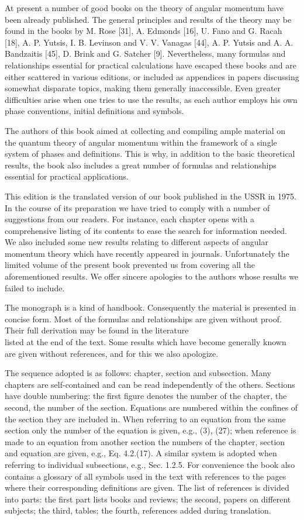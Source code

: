 At present a number of good books on the theory of angular momentum have been already published. The general principles and results of the theory may be found in the books by M. Rose [31], A. Edmonds [16], U. Fano and G. Racah [18], A. P. Yutsis, I. B. Levinson and V. V. Vanagas [44], A. P. Yutsis and A. A. Bandzaitis [45], D. Brink and G. Satcher [9]. Nevertheless, many formulas and relationships essential for practical calculations have escaped these books and are either scattered in various editions, or included as appendices in papers discussing somewhat disparate topics, making them generally inaccessible. Even greater difficulties arise when one tries to use the results, as each author employs his own phase conventions, initial definitions and symbols.

The authors of this book aimed at collecting and compiling ample material on the quantum theory of angular momentum within the framework of a single system of phases and definitions. This is why, in addition to the basic theoretical results, the book also includes a great number of formulas and relationships essential for practical applications.

This edition is the translated version of our book published in the USSR in 1975. In the course of its preparation we have tried to comply with a number of suggestions from our readers. For instance, each chapter opens with a comprehensive listing of its contents to ease the search for information needed. We also included some new results relating to different aspects of angular momentum theory which have recently appeared in journals. Unfortunately the limited volume of the present book prevented us from covering all the aforementioned results. We offer sincere apologies to the authors whose results we failed to include.

The monograph is a kind of handbook. Consequently the material is presented in concise form. Most of the formulas and relationships are given without proof. Their full derivation may be found in the literature\\
listed at the end of the text. Some results which have become generally known are given without references, and for this we also apologize.

The sequence adopted is as follows: chapter, section and subsection. Many chapters are self-contained and can be read independently of the others. Sections have double numbering: the first figure denotes the number of the chapter, the second, the number of the section. Equations are numbered within the confines of the section they are included in. When referring to an equation from the same section only the number of the equation is given, e.g., (3), (27); when reference is made to an equation from another section the numbers of the chapter, section and equation are given, e.g., Eq. 4.2.(17). A similar system is adopted when referring to individual subsections, e.g., Sec. 1.2.5. For convenience the book also contains a glossary of all symbols used in the text with references to the pages where their corresponding definitions are given. The list of references is divided into parts: the first part lists books and reviews; the second, papers on different subjects; the third, tables; the fourth, references added during translation.

